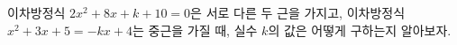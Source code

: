 이차방정식 $2x^2+8x+k+10=0$은 서로 다른 두 근을 가지고, 이차방정식 $x^2+3x+5=-kx+4$는 중근을 가질 때, 실수 $k$의 값은 어떻게 구하는지 알아보자.
